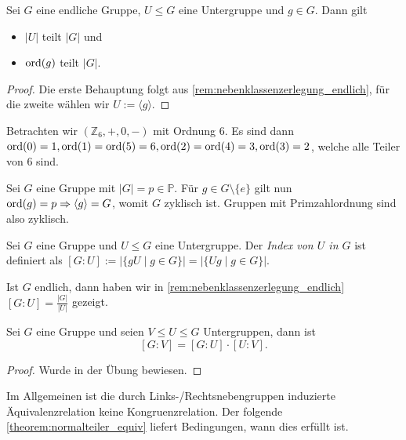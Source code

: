 \begin{theorem}[Lagrange]
    Sei $G$ eine endliche Gruppe, $U \le G$ eine Untergruppe und $g \in G$. Dann gilt
    \begin{itemize}
        \item $\vert U \vert$ teilt $\vert G \vert$ und
        \item $\operatorname{ord}(g)$ teilt $\vert G \vert $.
    \end{itemize}
\end{theorem}
\begin{proof}
    Die erste Behauptung folgt aus \cref{rem:nebenklassenzerlegung_endlich}, für die zweite wählen wir $U := \langle g \rangle$.
\end{proof}

\begin{example}
    Betrachten wir $(\mathbb{Z}_6, +, 0, -)$ mit Ordnung 6. Es sind dann $\operatorname{ord}(0) = 1, \operatorname{ord}(1) = \operatorname{ord}(5) = 6, \operatorname{ord}(2) = \operatorname{ord}(4) = 3, \operatorname{ord}(3) = 2$, welche alle Teiler von 6 sind.

    Sei $G$ eine Gruppe mit $\vert G \vert = p \in \mathbb{P}$. Für $g \in G\setminus\{e\}$ gilt nun $\operatorname{ord}(g) = p \Rightarrow \langle g \rangle = G$, womit $G$ zyklisch ist. Gruppen mit Primzahlordnung sind also zyklisch.
\end{example}

\begin{definition}
    Sei $G$ eine Gruppe und $U \le G$ eine Untergruppe. Der \emph{Index von $U$ in $G$} ist definiert als $[G:U] := \vert \{gU \mid g \in G\}\vert = \vert \{Ug \mid g \in G\}\vert$. 
\end{definition}

\begin{remark}
    Ist $G$ endlich, dann haben wir in \cref{rem:nebenklassenzerlegung_endlich} $[G:U] = \frac{\vert G \vert}{\vert U \vert}$ gezeigt.
\end{remark}

\begin{theorem}[Indexsatz]
    Sei $G$ eine Gruppe und seien $V \le U \le G$ Untergruppen, dann ist $$[G:V] = [G:U] \cdot [U:V].$$ 
\end{theorem}
\begin{proof}
    Wurde in der Übung bewiesen.
\end{proof}

Im Allgemeinen ist die durch Links-/Rechtsnebengruppen induzierte Äquivalenzrelation keine Kongruenzrelation. Der folgende \cref{theorem:normalteiler_equiv} liefert Bedingungen, wann dies erfüllt ist.

